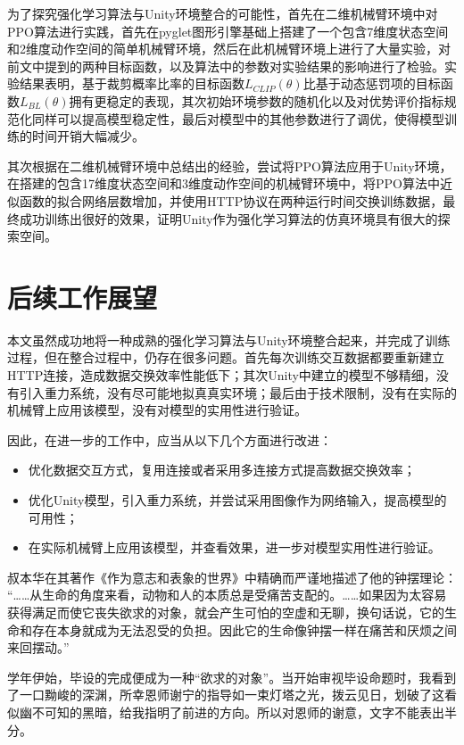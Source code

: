 \documentclass[bachelor]{thesis-uestc}
\begin{document}
	为了探究强化学习算法与Unity环境整合的可能性，首先在二维机械臂环境中对PPO算法进行实践，首先在pyglet图形引擎基础上搭建了一个包含7维度状态空间和2维度动作空间的简单机械臂环境，然后在此机械臂环境上进行了大量实验，对前文中提到的两种目标函数，以及算法中的参数对实验结果的影响进行了检验。实验结果表明，基于裁剪概率比率的目标函数$L_{CLIP}(\theta)$比基于动态惩罚项的目标函数$L_{BL}(\theta)$拥有更稳定的表现，其次初始环境参数的随机化以及对优势评价指标规范化同样可以提高模型稳定性，最后对模型中的其他参数进行了调优，使得模型训练的时间开销大幅减少。
	
	其次根据在二维机械臂环境中总结出的经验，尝试将PPO算法应用于Unity环境，在搭建的包含17维度状态空间和3维度动作空间的机械臂环境中，将PPO算法中近似函数的拟合网络层数增加，并使用HTTP协议在两种运行时间交换训练数据，最终成功训练出很好的效果，证明Unity作为强化学习算法的仿真环境具有很大的探索空间。
	
	\section{后续工作展望}
	本文虽然成功地将一种成熟的强化学习算法与Unity环境整合起来，并完成了训练过程，但在整合过程中，仍存在很多问题。首先每次训练交互数据都要重新建立HTTP连接，造成数据交换效率性能低下；其次Unity中建立的模型不够精细，没有引入重力系统，没有尽可能地拟真真实环境；最后由于技术限制，没有在实际的机械臂上应用该模型，没有对模型的实用性进行验证。
	
	因此，在进一步的工作中，应当从以下几个方面进行改进：
	\begin{itemize}
		\item 优化数据交互方式，复用连接或者采用多连接方式提高数据交换效率；
		\item 优化Unity模型，引入重力系统，并尝试采用图像作为网络输入，提高模型的可用性；
		\item 在实际机械臂上应用该模型，并查看效果，进一步对模型实用性进行验证。
	\end{itemize}
	
	\thesisacknowledgement
	叔本华在其著作《作为意志和表象的世界》中精确而严谨地描述了他的钟摆理论：
	“……从生命的角度来看，动物和人的本质总是受痛苦支配的。……如果因为太容易获得满足而使它丧失欲求的对象，就会产生可怕的空虚和无聊，换句话说，它的生命和存在本身就成为无法忍受的负担。因此它的生命像钟摆一样在痛苦和厌烦之间来回摆动。”
	
	学年伊始，毕设的完成便成为一种“欲求的对象”。当开始审视毕设命题时，我看到了一口黝峻的深渊，所幸恩师谢宁的指导如一束灯塔之光，拨云见日，划破了这看似幽不可知的黑暗，给我指明了前进的方向。所以对恩师的谢意，文字不能表出半分。
	
\end{document}
